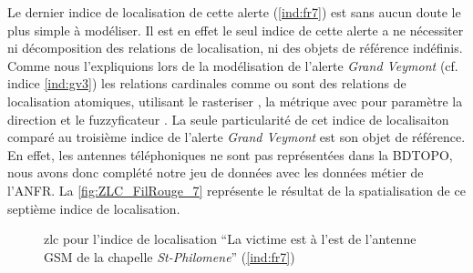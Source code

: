 
Le dernier indice de localisation de cette alerte (\ref{ind:fr7}) est
sans aucun doute le plus simple à modéliser. Il est en effet le seul
indice de cette alerte a ne nécessiter ni décomposition des relations
de localisation, ni des objets de référence indéfinis. Comme nous
l'expliquions lors de la modélisation de l'alerte \emph{Grand Veymont}
(cf. indice \ref{ind:gv3}) les relations cardinales comme
 ou  sont des
relations de localisation atomiques, utilisant le rasteriser
, la métrique \onto[orla]{} avec pour paramètre
la direction et le fuzzyficateur . La seule
particularité de cet indice de localisaiton comparé au troisième
indice de l'alerte \emph{Grand Veymont} est son objet de référence. En
effet, les antennes téléphoniques ne sont pas représentées dans la
BDTOPO, nous avons donc complété notre jeu de données avec les données
métier de l'ANFR. La \autoref{fig:ZLC_FilRouge_7} représente le
résultat de la spatialisation de ce septième indice de localisation.

\begin{figure}
  \centering
  
  \caption{\ac{zlc} pour l'indice de localisation \enquote{La victime
      est à l'est de l'antenne GSM de la chapelle \emph{St-Philomene}}
    (\ref{ind:fr7})}
    \label{fig:ZLC_FilRouge_7}
\end{figure}



